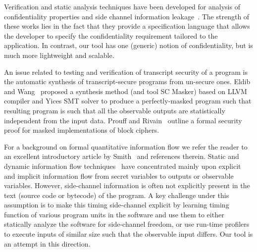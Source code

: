 Verification and static analysis techniques have been developed for
analysis of confidentiality properties and side channel information
leakage~\cite{EWS14,KMO12,BSB07,BDG12,CA09}. The strength of these
works lies in the fact that they provide a specification language that
allows the developer to specify the confidentiality requirement
tailored to the application. In contrast, our tool has one
(generic) notion of confidentiality, but is much more lightweight and
scalable. 

An issue related to testing and verification of transcript security of
a program is the automatic synthesis of transcript-secure programs
from un-secure ones. Eldib and Wang~\cite{EW14} proposed a synthesis
method (and tool SC Masker) based on LLVM compiler and Yices SMT
solver to produce a perfectly-masked 
program such that resulting program is such that all the observable outputs are
statistically independent from the input data. 
Prouff and Rivain~\cite{PR13} outline a formal security proof for masked
implementations of block ciphers.      

For a background on formal quantitative information flow we refer the reader to
an excellent introductory article by Smith~\cite{smith09} and references therein.
Static and dynamic information flow techniques~\cite{SR10,Den76} have concentrated
mainly upon explicit and implicit information flow from secret variables to
outputs or observable variables.
However, side-channel information is often not explicitly present in the text
(source code or bytecode) of the program.
A key challenge under this assumption is to make this timing side-channel
explicit by learning timing function of various program units in the software
and use them to either statically analyze the software for side-channel freedom,
or use run-time profilers to execute inputs of similar size such that the
observable input differs.
Our tool is an attempt in this direction.




